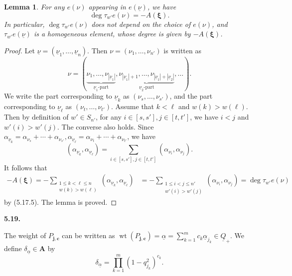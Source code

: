 \documentclass[12pt]{amsart}
\renewcommand\a{\alpha}
\renewcommand\d{\delta}
\renewcommand\t{\tau}
\renewcommand{\1}{\mathbb 1}
\newcommand\BA{\mathbf A}
\newcommand\Bj{\mathbf j}
\newcommand\Bc{\mathbf c}
\newcommand\Bxi{\boldsymbol\xi}
\newcommand\ul{\underline}
\newcommand\weit{\operatorname{wt}}
\numberwithin{equation}{section}
\newtheorem{lem}[thm]{Lemma}
\def \para#1{\par\medskip\textbf{#1}
              \addtocounter{thm}{1}}
\begin{document}
\begin{lem}   %
For any $e(\nu)$ appearing in $e(\ul\nu)$, we have
\begin{equation*}
\tag{5.18.1}
\deg\tau_{w'}e(\nu) = -A(\Bxi).
\end{equation*}  
In particular, $\deg\t_{w'}e(\nu)$ does not depend on the choice of $e(\nu)$,
and $\t_{w'}e(\ul\nu)$ is a homogeneous element, whose degree is given by $-A(\Bxi)$. 
\end{lem}  
\begin{proof}
Let $\ul\nu = (\ul\nu_1,\dots, \ul\nu_n)$.  Then $\nu = (\nu_1, \dots, \nu_{n'})$
is written as
\begin{equation*}
\nu = (\underbrace{\nu_1, \dots, \nu_{|\ul\nu_1|}}_{\ul\nu_1\text{-part}},
 \underbrace{\nu_{|\ul\nu_1|+1}, \dots,
         \nu_{|\ul\nu_1| + |\ul\nu_2|}}_{\ul\nu_2\text{-part}}, \dots).
\end{equation*}
We write the part corresponding to $\ul\nu_k$
as $(\nu_s, \dots, \nu_{s'})$,
and the part corresponding to $\ul\nu_{\ell}$
as $(\nu_t, \dots, \nu_{t'})$.
Assume that $k < \ell$ and $w(k) > w(\ell)$. Then by definition of $w' \in S_{n'}$,
for any $i \in [s,s'], j \in [t,t']$, we have $i < j$ and $w'(i) > w'(j)$. 
The converse also holds. 
Since $\a_{\ul\nu_k} = \a_{\nu_s} + \cdots + \a_{\nu_{s'}},
               \a_{\ul\nu_{\ell}} = \a_{\nu_t} + \cdots + \a_{\nu_{t'}}$,
we have
\begin{equation*}
  (\a_{\ul\nu_k}, \a_{\ul\nu_{\ell}}) = \sum_{i \in [s,s'], j \in [t,t']}
         (\a_{\nu_i}, \a_{\nu_j}).
\end{equation*}  
It follows that
\begin{align*}
-A(\Bxi) =   
  -\sum_{\substack{ 1 \le k < \ell \le n  \\ w(k) > w(\ell)}}(\a_{\ul\nu_k}, \a_{\ul\nu_{\ell}})
    &= - \sum_{\substack{1 \le i < j \le n' \\ w'(i) > w'(j) }} (\a_{\nu_i}, \a_{\nu_j})
      = \deg\tau_{w'}e(\nu)
\end{align*}
by (5.17.5).  The lemma is proved.
\end{proof}  

\para{5.19.}
The weight of $P_{\Bj,\Bc}$ can be written as
$\weit(P_{\Bj,\Bc}) = \ul\a = \sum_{k=1}^mc_k\ul\a_{j_k} \in \ul Q_+$. 
We define $\d_{\ul\a} \in \BA$ by
\begin{equation*}
\tag{5.19.1}  
\d_{\ul\a} = \prod_{k=1}^m(1-q_{j_k}^2)^{c_k}.
\end{equation*}
\end{document}

